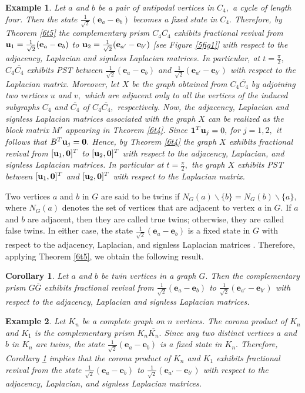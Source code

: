 \documentclass[12pt,a4paper]{article}
\newtheorem{cor}{Corollary}
\newtheorem{exm}{Example}
\def \e {{\bf e}}
\def \u {{\bf u}}
\def \e {{\mathbf e}}
\begin{document}
\begin{exm}
Let $a$ and $b$ be a pair of antipodal vertices in $C_4,$ a cycle of length four. Then the state $\frac{1}{\sqrt{2}}(\e_a-\e_b)$ becomes a fixed state in $C_4.$ Therefore, by Theorem \ref{6t5} the complementary prism $C_4\overline{C_4}$ exhibits fractional revival from $\u_1=\frac{1}{\sqrt{2}}(\e_a-\e_b)$ to $\u_2=\frac{1}{\sqrt{2}}(\e_{a'}-\e_{b'})$ [see Figure \ref{5fig1}] with respect to the adjacency, Laplacian and signless Laplacian matrices. In particular, at $t=\frac{\pi}{2},$ $C_4\overline{C_4}$ exhibits PST between $\frac{1}{\sqrt{2}}(\e_a-\e_b)$ and $\frac{1}{\sqrt{2}}(\e_{a'}-\e_{b'})$ with respect to the Laplacian matrix. Moreover, let $X$ be the graph obtained from $C_4\overline{C_4}$ by adjoining two vertices $u$ and $v,$ which are adjacent only to all the vertices of the induced subgraphs $C_4$ and $\overline{C_4}$ of $C_4\overline{C_4},$ respectively. Now, the adjacency, Laplacian and signless Laplacian matrices associated with the graph $X$ can be realized as the block matrix $M'$ appearing in Theorem \ref{6t4}. Since $\mathbf{1}^T\u_j=0,$ for $j=1,2,$ it follows that $B^T\u_j=\mathbf{0}.$ Hence, by Theorem \ref{6t4} the graph $X$ exhibits fractional revival from $[\u_1,\mathbf{0}]^T$ to $[\u_2,\mathbf{0}]^T$ with respect to the adjacency, Laplacian, and signless Laplacian matrices. In particular at $t=\frac{\pi}{2},$ the graph $X$ exhibits PST between $[\u_1,\mathbf{0}]^T$ and $[\u_2,\mathbf{0}]^T$ with respect to the Laplacian matrix. 
\end{exm}
Two vertices $a$ and $b$ in $G$ are said to be twins if $N_G(a)\backslash\{b\}=N_G(b)\backslash\{a\},$ where $N_G(a)$ denotes the set of vertices that are adjacent to vertex $a$ in $G.$ If $a$ and $b$ are adjacent, then they are called true twins; otherwise, they are called false twins. In either case, the state $\frac{1}{\sqrt{2}}(\e_a-\e_b)$ is a fixed state in $G$ with respect to the adjacency, Laplacian, and signless Laplacian matrices \cite[Example 2.4(iii)]{god7}. Therefore, applying Theorem \ref{6t5}, we obtain the following result.
\begin{cor}\label{6c3}
  Let $a$ and $b$ be twin vertices in a graph $G.$  Then the complementary prism $G\overline{G}$ exhibits fractional revival from $\frac{1}{\sqrt{2}}(\e_a-\e_b)$ to $\frac{1}{\sqrt{2}}(\e_{a'}-\e_{b'})$ with respect to the adjacency, Laplacian and signless Laplacian matrices.   
\end{cor}
\begin{exm}\label{5ex3}
    Let $K_n$ be a complete graph on $n$ vertices. The corona product of $K_n$ and $K_1$ is the complementary prism $K_n\overline{K_n}.$ Since any two distinct vertices $a$ and $b$ in $K_n$ are twins, the state $\frac{1}{\sqrt{2}}(\e_a-\e_b)$ is a fixed state in $K_n.$ Therefore, Corollary \ref{6c3} implies that the corona product of $K_n$ and $K_1$ exhibits fractional revival from the state $\frac{1}{\sqrt{2}}(\e_a-\e_b)$ to $\frac{1}{\sqrt{2}}(\e_{a'}-\e_{b'})$ with respect to the adjacency, Laplacian, and signless Laplacian matrices.
\end{exm}
\end{document}
